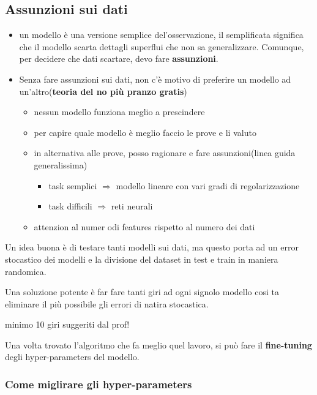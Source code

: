 \subsection{Assunzioni sui dati}
\begin{itemize}
    \item un modello è una versione semplice del'osservazione, il semplificata significa che
    il modello scarta dettagli superflui che non sa generalizzare.
    Comunque, per decidere che dati scartare, devo fare \textbf{assunzioni}.
    \item Senza fare assunzioni sui dati, non c'è motivo di preferire un modello ad
    un'altro(\textbf{teoria del no più pranzo gratis})
    \begin{itemize}
        \item nessun modello funziona meglio a prescindere
        \item per capire quale modello è meglio faccio le prove e li valuto
        \item in alternativa alle prove, posso ragionare e fare assunzioni(linea guida generalissima)
        \begin{itemize}
            \item task semplici $\Rightarrow$ modello lineare con vari gradi di regolarizzazione
            \item task difficili $\Rightarrow$ reti neurali
        \end{itemize}
        \item attenzion al numer odi features rispetto al numero dei dati
    \end{itemize}
\end{itemize}

Un idea buona è di testare tanti modelli sui dati, ma questo porta ad un error
stocastico dei modelli e la divisione del dataset in test e train in maniera randomica.

Una soluzione potente è far fare tanti giri ad ogni signolo modello cosi  ta eliminare
il più possibile gli errori di natira stocastica.

minimo 10 giri suggeriti dal prof!

Una volta trovato l'algoritmo che fa meglio quel lavoro, si può fare
il \textbf{fine-tuning} degli hyper-parameters del modello.

\subsubsection{Come miglirare gli hyper-parameters}

